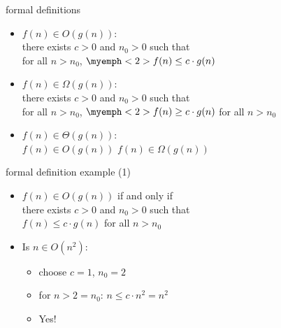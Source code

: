 \begin{frame}{formal definitions}
    \begin{itemize}
    \item $f(n) \in O(g(n))$: \\
        \hspace{.5cm}there exists $c > 0$ and $n_0 > 0$ such that \\
        \hspace{.5cm}for all $n > n_0$, $\myemph<2>{f(n) \le c \cdot g(n)}$
    \vspace{.5cm}
    \item<2-> $f(n) \in \Omega(g(n))$: \\
        \hspace{.5cm}there exists $c > 0$ and $n_0 > 0$ such that \\
        \hspace{.5cm}for all $n > n_0$, $\myemph<2>{f(n) \ge c \cdot g(n)}$ for all $n > n_0$
    \vspace{.5cm}
    \item<3-> $f(n) \in \Theta(g(n))$: \\
          \hspace{.5cm} $f(n) \in O(g(n))$  $f(n) \in \Omega(g(n))$
    \end{itemize}
\end{frame}

\begin{frame}{formal definition example (1)}
    \begin{itemize}
    \item $f(n) \in O(g(n))$ if and only if \\
        \hspace{.5cm}there exists $c > 0$ and $n_0 > 0$ such that \\
        \hspace{.5cm}$f(n) \le c \cdot g(n)$ for all $n > n_0$
    \item Is $ n \in O(n^2)$:
        \begin{itemize}
        \item<2-> choose $c = 1$, $n_0 = 2$
        \item<2-> for $n > 2=n_0$: $n \le c\cdot n^2 = n^2$
        \item<2-> Yes!
        \end{itemize}
    \end{itemize}
\end{frame}

